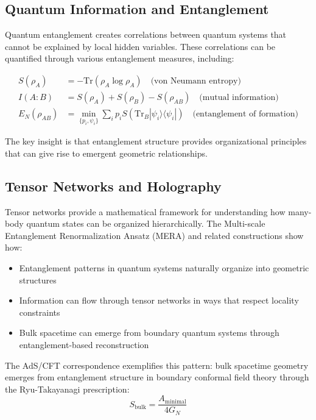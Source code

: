 \documentclass[12pt]{article}
\begin{document}
\subsection{Quantum Information and Entanglement}

Quantum entanglement creates correlations between quantum systems that cannot be explained by local hidden variables. These correlations can be quantified through various entanglement measures, including:

\begin{align}
S(\rho_A) &= -\text{Tr}(\rho_A \log \rho_A) \quad \text{(von Neumann entropy)} \\
I(A:B) &= S(\rho_A) + S(\rho_B) - S(\rho_{AB}) \quad \text{(mutual information)} \\
E_N(\rho_{AB}) &= \min_{\{p_i, \psi_i\}} \sum_i p_i S(\text{Tr}_B|\psi_i\rangle\langle\psi_i|) \quad \text{(entanglement of formation)}
\end{align}

The key insight is that entanglement structure provides organizational principles that can give rise to emergent geometric relationships.

\subsection{Tensor Networks and Holography}

Tensor networks provide a mathematical framework for understanding how many-body quantum states can be organized hierarchically. The Multi-scale Entanglement Renormalization Ansatz (MERA) and related constructions show how:

\begin{itemize}
\item Entanglement patterns in quantum systems naturally organize into geometric structures
\item Information can flow through tensor networks in ways that respect locality constraints
\item Bulk spacetime can emerge from boundary quantum systems through entanglement-based reconstruction
\end{itemize}

The AdS/CFT correspondence exemplifies this pattern: bulk spacetime geometry emerges from entanglement structure in boundary conformal field theory through the Ryu-Takayanagi prescription:
\begin{equation}
S_{\text{bulk}} = \frac{A_{\text{minimal}}}{4G_N}
\end{equation}
\end{document}
